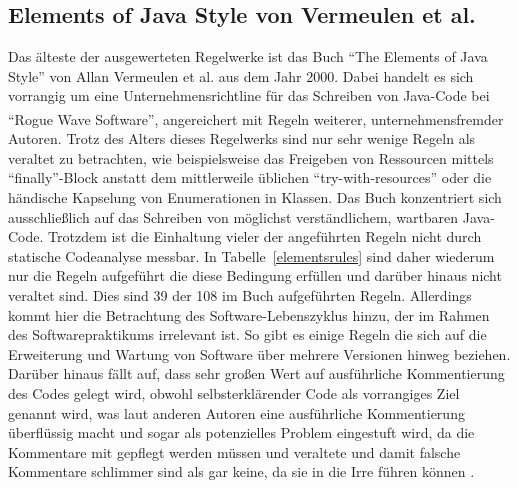 \documentclass[da,ngerman]{stthesis}
\begin{document}
			\subsection{Elements of Java Style von Vermeulen et al.}
				Das älteste der ausgewerteten Regelwerke ist das Buch "`The Elements of Java Style"' von Allan Vermeulen et al. \cite{ElementsOfJavaStyle} aus dem Jahr 2000. Dabei handelt es sich vorrangig um eine Unternehmensrichtline für das Schreiben von Java-Code bei "`Rogue Wave\textsuperscript{\textregistered} Software"', angereichert mit Regeln weiterer, unternehmensfremder Autoren. Trotz des Alters dieses Regelwerks sind nur sehr wenige Regeln als veraltet zu betrachten, wie beispielsweise das Freigeben von Ressourcen mittels "`finally"'-Block anstatt dem mittlerweile üblichen "`try-with-resources"' oder die händische Kapselung von Enumerationen in Klassen. \newline
				Das Buch konzentriert sich ausschließlich auf das Schreiben von möglichst verständlichem, wartbaren Java-Code. Trotzdem ist die Einhaltung vieler der angeführten Regeln nicht durch statische Codeanalyse messbar. In Tabelle~\ref{elementsrules} sind daher wiederum nur die Regeln aufgeführt die diese Bedingung erfüllen und darüber hinaus nicht veraltet sind. Dies sind 39 der 108 im Buch aufgeführten Regeln. \newline
				Allerdings kommt hier die Betrachtung des Software-Lebenszyklus hinzu, der im Rahmen des Softwarepraktikums irrelevant ist. So gibt es einige Regeln die sich auf die Erweiterung und Wartung von Software über mehrere Versionen hinweg beziehen. Darüber hinaus fällt auf, dass sehr großen Wert auf ausführliche Kommentierung des Codes gelegt wird, obwohl selbsterklärender Code als vorrangiges Ziel genannt wird, was laut anderen Autoren eine ausführliche Kommentierung überflüssig macht und sogar als potenzielles Problem eingestuft wird, da die Kommentare mit gepflegt werden müssen und veraltete und damit falsche Kommentare schlimmer sind als gar keine, da sie in die Irre führen können \cite{CleanCode}.
\end{document}
